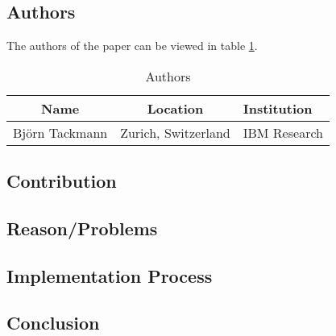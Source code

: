 \clearpage
\section*{\citet{2017_Tackmann}}

\subsection*{Authors}
The authors of the paper can be viewed in table \ref{tab:2017_Tackmann_Authors}.
\begin{longtable}{ |c|c|p{5cm}| }
	\caption{Authors} \label{tab:2017_Tackmann_Authors} \\
	\hline
 	\cellcolor{Gray}Name & \cellcolor{Gray}Location & \cellcolor{Gray}Institution \\ [0.5ex] 
 	\hline\hline
 	\endhead
 	Björn Tackmann & Zurich, Switzerland  & IBM Research  \\
	 \hline
\end{longtable}


\subsection*{Contribution}



\subsection*{Reason/Problems}



\subsection*{Implementation Process}


\subsection*{Conclusion}

